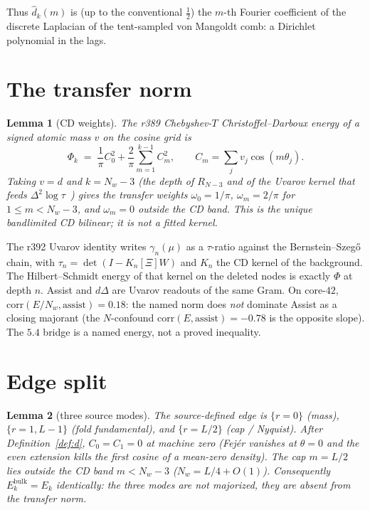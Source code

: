 \documentclass[11pt]{article}
\newtheorem{lemma}{Lemma}
\theoremstyle{remark}
\newcommand{\dhat}{\widehat{d}}
\begin{document}
Thus $\dhat_k(m)$ is (up to the conventional $\tfrac12$) the
$m$-th Fourier coefficient of the discrete Laplacian of the
tent-sampled von Mangoldt comb: a Dirichlet polynomial in
the lags.

\section{The transfer norm}\label{sec:omega}

\begin{lemma}[CD weights]\label{lem:omega}
The r389 Chebyshev-$T$ Christoffel--Darboux energy of a signed
atomic mass $v$ on the cosine grid is
\[
\Phi_k
\;=\;
\frac1\pi C_0^2+\frac2\pi\sum_{m=1}^{k-1}C_m^2,
\qquad
C_m=\sum_j v_j\cos(m\theta_j).
\]
Taking $v=d$ and $k=N_w-3$ (the depth of $R_{N-3}$ and of the
Uvarov kernel that feeds $\Delta^2\log\tau$~\cite{r392,r393})
gives the transfer weights
$\omega_0=1/\pi$, $\omega_m=2/\pi$ for $1\le m<N_w-3$, and
$\omega_m=0$ outside the CD band.
This is the unique bandlimited CD bilinear; it is not a
fitted kernel.
\end{lemma}

The r392 Uvarov identity writes $\gamma_n(\mu)$ as a
$\tau$-ratio against the Bernstein--Szeg\H{o} chain, with
$\tau_n=\det(I-K_n[\Xi]W)$ and $K_n$ the CD kernel of the
background.
The Hilbert--Schmidt energy of that kernel on the deleted
nodes is exactly $\Phi$ at depth $n$.
Assist and $d\Delta$ are Uvarov readouts of the same Gram.
On core-$42$, $\mathrm{corr}(E/N_w,\mathrm{assist})=0.18$:
the named norm does \emph{not} dominate Assist as a closing
majorant (the $N$-confound $\mathrm{corr}(E,\mathrm{assist})=-0.78$
is the opposite slope).
The $5.4$ bridge is a named energy, not a proved inequality.

\section{Edge split}\label{sec:edge}

\begin{lemma}[three source modes]\label{lem:edge}
The source-defined edge is $\{r=0\}$ (mass),
$\{r=1,L-1\}$ (fold fundamental), and $\{r=L/2\}$ (cap /
Nyquist).
After Definition~\ref{def:d}, $C_0=C_1=0$ at machine zero
(Fej\'er vanishes at $\theta=0$ and the even extension kills
the first cosine of a mean-zero density).
The cap $m=L/2$ lies outside the CD band $m<N_w-3$
($N_w=L/4+O(1)$).
Consequently $E_k^{\mathrm{bulk}}=E_k$ identically: the three
modes are not majorized, they are absent from the transfer
norm.
\end{lemma}
\end{document}
